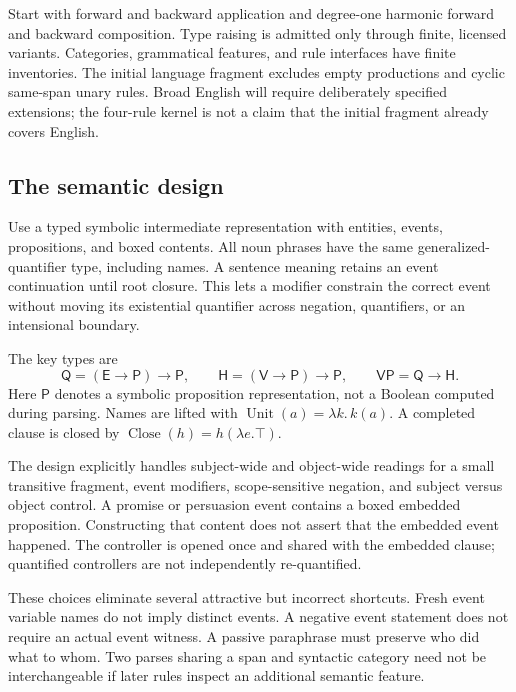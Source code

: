 \documentclass[11pt,a4paper]{article}
\newcommand{\E}{\mathsf{E}}
\newcommand{\V}{\mathsf{V}}
\newcommand{\Prop}{\mathsf{P}}
\newcommand{\Q}{\mathsf{Q}}
\newcommand{\HH}{\mathsf{H}}
\newcommand{\VP}{\mathsf{VP}}
\newcommand{\Close}{\operatorname{Close}}
\newcommand{\Unit}{\operatorname{Unit}}
\begin{document}
Start with forward and backward application and degree-one harmonic forward
and backward composition. Type raising is admitted only through finite,
licensed variants. Categories, grammatical features, and rule interfaces have
finite inventories. The initial language fragment excludes empty productions
and cyclic same-span unary rules. Broad English will require deliberately
specified extensions; the four-rule kernel is not a claim that the initial
fragment already covers English.

\subsection*{The semantic design}
Use a typed symbolic intermediate representation with entities, events,
propositions, and boxed contents. All noun phrases have the same
generalized-quantifier type, including names. A sentence meaning retains an
event continuation until root closure. This lets a modifier constrain the
correct event without moving its existential quantifier across negation,
quantifiers, or an intensional boundary.

The key types are
\[
  \Q=(\E\to\Prop)\to\Prop,\qquad
  \HH=(\V\to\Prop)\to\Prop,\qquad
  \VP=\Q\to\HH .
\]
Here \(\Prop\) denotes a symbolic proposition representation, not a Boolean
computed during parsing. Names are lifted with
\(\Unit(a)=\lambda k.\,k(a)\). A completed clause is closed by
\(\Close(h)=h(\lambda e.\top)\).

The design explicitly handles subject-wide and object-wide readings for a
small transitive fragment, event modifiers, scope-sensitive negation, and
subject versus object control. A promise or persuasion event contains a boxed
embedded proposition. Constructing that content does not assert that the
embedded event happened. The controller is opened once and shared with the
embedded clause; quantified controllers are not independently re-quantified.

These choices eliminate several attractive but incorrect shortcuts. Fresh
event variable names do not imply distinct events. A negative event statement
does not require an actual event witness. A passive paraphrase must preserve
who did what to whom. Two parses sharing a span and syntactic category need not
be interchangeable if later rules inspect an additional semantic feature.
\end{document}
